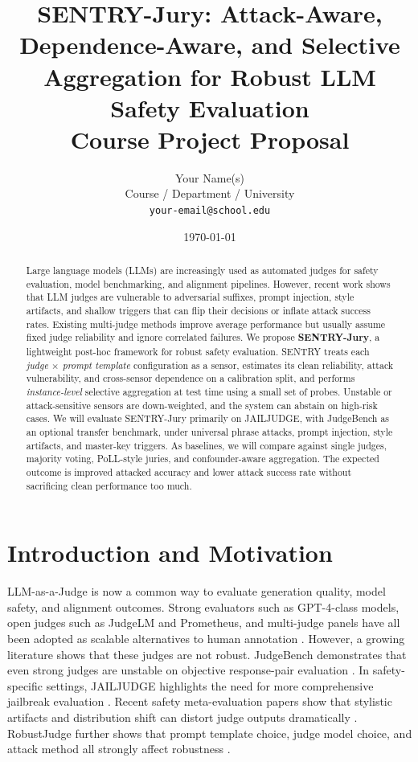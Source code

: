 \documentclass[11pt]{article}
\title{\textbf{SENTRY-Jury: Attack-Aware, Dependence-Aware, and Selective Aggregation for Robust LLM Safety Evaluation}\\
\vspace{0.4em}
\large Course Project Proposal}
\author{
Your Name(s) \\
Course / Department / University \\
\texttt{your-email@school.edu}
}
\date{\today}
\begin{document}
\maketitle

\begin{abstract}
Large language models (LLMs) are increasingly used as automated judges for safety evaluation, model benchmarking, and alignment pipelines. However, recent work shows that LLM judges are vulnerable to adversarial suffixes, prompt injection, style artifacts, and shallow triggers that can flip their decisions or inflate attack success rates. Existing multi-judge methods improve average performance but usually assume fixed judge reliability and ignore correlated failures. We propose \textbf{SENTRY-Jury}, a lightweight post-hoc framework for robust safety evaluation. SENTRY treats each \emph{judge $\times$ prompt template} configuration as a sensor, estimates its clean reliability, attack vulnerability, and cross-sensor dependence on a calibration split, and performs \emph{instance-level} selective aggregation at test time using a small set of probes. Unstable or attack-sensitive sensors are down-weighted, and the system can abstain on high-risk cases. We will evaluate SENTRY-Jury primarily on JAILJUDGE, with JudgeBench as an optional transfer benchmark, under universal phrase attacks, prompt injection, style artifacts, and master-key triggers. As baselines, we will compare against single judges, majority voting, PoLL-style juries, and confounder-aware aggregation. The expected outcome is improved attacked accuracy and lower attack success rate without sacrificing clean performance too much.
\end{abstract}

\section{Introduction and Motivation}
LLM-as-a-Judge is now a common way to evaluate generation quality, model safety, and alignment outcomes. Strong evaluators such as GPT-4-class models, open judges such as JudgeLM and Prometheus, and multi-judge panels have all been adopted as scalable alternatives to human annotation \citep{zhu2023judgelm,kim2023prometheus,verga2024poll}. However, a growing literature shows that these judges are not robust. JudgeBench demonstrates that even strong judges are unstable on objective response-pair evaluation \citep{tan2024judgebench}. In safety-specific settings, JAILJUDGE highlights the need for more comprehensive jailbreak evaluation \citep{liu2024jailjudge}. Recent safety meta-evaluation papers show that stylistic artifacts and distribution shift can distort judge outputs dramatically \citep{eiras2025know,chen2025safer,schwinn2026coinflip}. RobustJudge further shows that prompt template choice, judge model choice, and attack method all strongly affect robustness \citep{li2025robustjudge}.
\end{document}

